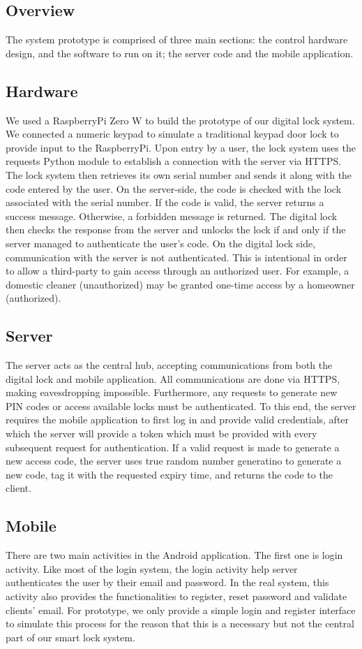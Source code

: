 \documentclass[conference]{IEEEtran}
\begin{document}
\subsection{Overview}
The system prototype is comprised of three main sections: the control hardware design, and the software to run on it; the server code and the mobile application.

\subsection{Hardware}
	We used a RaspberryPi Zero W to build the prototype of our digital lock system. We connected a numeric keypad to simulate a traditional keypad door lock to provide input to the RaspberryPi. Upon entry by a user, the lock system uses the requests Python module to establish a connection with the server via HTTPS. The lock system then retrieves its own serial number and sends it along with the code entered by the user. On the server-side, the code is checked with the lock associated with the serial number. If the code is valid, the server returns a success message. Otherwise, a forbidden message is returned. The digital lock then checks the response from the server and unlocks the lock if and only if the server managed to authenticate the user’s code. On the digital lock side, communication with the server is not authenticated. This is intentional in order to allow a third-party to gain access through an authorized user. For example, a domestic cleaner (unauthorized) may be granted one-time access by a homeowner (authorized).
\subsection{Server}
The server acts as the central hub, accepting communications from both the digital lock and mobile application. All communications are done via HTTPS, making eavesdropping impossible. Furthermore, any requests to generate new PIN codes or access available locks must be authenticated. To this end, the server requires the mobile application to first log in and provide valid credentials, after which the server will provide a token which must be provided with every subsequent request for authentication. If a valid request is made to generate a new access code, the server uses true random number generatino to generate a new code, tag it with the requested expiry time, and returns the code to the client.

\subsection{Mobile}
There are two main activities in the Android application. The first one is login activity. Like most of the login system, the login activity help server authenticates the user by their email and password. In the real system, this activity also provides the functionalities to register, reset password and validate clients’ email. For prototype, we only provide a simple login and register interface to simulate this process for the reason that this is a necessary but not the central part of our smart lock system.
\end{document}
